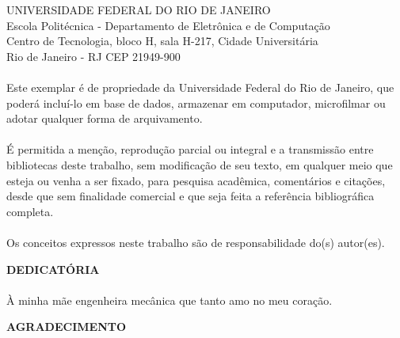 \pagebreak

      \vspace{0.5cm}

UNIVERSIDADE FEDERAL DO RIO DE JANEIRO \\
Escola Politécnica - Departamento de Eletrônica e de Computação \\
Centro de Tecnologia, bloco H, sala H-217, Cidade Universitária \\
Rio de Janeiro - RJ      CEP 21949-900\\
\vspace{0.5cm}
\paragraph{}Este exemplar é de propriedade da Universidade Federal do Rio de Janeiro, que poderá incluí-lo em base de dados, armazenar em computador, microfilmar ou adotar qualquer forma de arquivamento.
\paragraph{}É permitida a menção, reprodução parcial ou integral e a transmissão entre bibliotecas deste trabalho, sem modificação de seu texto, em qualquer meio que esteja ou venha a ser fixado, para pesquisa acadêmica, comentários e citações, desde que sem finalidade comercial e que seja feita a referência bibliográfica completa.
\paragraph{}Os conceitos expressos neste trabalho são de responsabilidade do(s) autor(es).


\pagebreak

\begin{center}
\textbf{DEDICATÓRIA}
\end{center}
      \vspace{0.5cm}

\paragraph{} \`A minha m\~ae engenheira mec\^anica que tanto amo no meu cora\c{c}\~ao.

\pagebreak


\begin{center}
\textbf{AGRADECIMENTO}
\end{center}
      \vspace{0.5cm}



